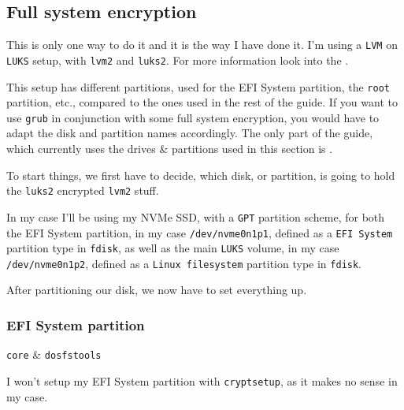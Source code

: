 \documentclass[10pt]{dustdoc}
\begin{document}
\subsection{Full system encryption}%
\label{sec:full-system-encryption}

\begin{NOTE}
    This is only one way to do it and it is the way I have done it.
    I’m using a \texttt{LVM} on \texttt{LUKS} setup, with \texttt{lvm2} and \texttt{luks2}.
    For more information look into the .
\end{NOTE}

\begin{NOTE}
    This setup has different partitions, used for the EFI System partition, the \texttt{root} partition, etc., compared to the ones used in the rest of the guide.
    If you want to use \texttt{grub} in conjunction with some full system encryption, you would have to adapt the disk and partition names accordingly.
    The only part of the guide, which currently uses the drives \& partitions used in this section is .
\end{NOTE}

To start things, we first have to decide, which disk, or partition, is going to hold the \texttt{luks2} encrypted \texttt{lvm2} stuff.

In my case I’ll be using my NVMe SSD, with a \texttt{GPT} partition scheme, for both the EFI System partition, in my case \texttt{/dev/nvme0n1p1}, defined as a \texttt{EFI System} partition type in \texttt{fdisk}, as well as the main \texttt{LUKS} volume, in my case \texttt{/dev/nvme0n1p2}, defined as a \texttt{Linux filesystem} partition type in \texttt{fdisk}.

After partitioning our disk, we now have to set everything up.

\subsubsection{EFI System partition}%
\label{sec:efi-system-partition}

\begin{pkgtable}
    \texttt{core} & \texttt{dosfstools} \\
\end{pkgtable}

I won’t setup my EFI System partition with \texttt{cryptsetup}, as it makes no sense in my case.
\end{document}
